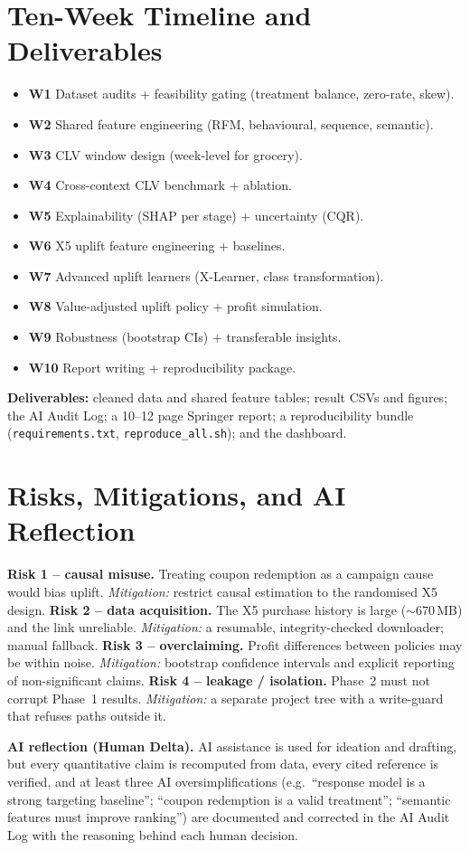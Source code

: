 \documentclass[pdflatex,sn-mathphys-num]{sn-jnl}
\begin{document}
\section{Ten-Week Timeline and Deliverables}\label{sec:time}
\begin{itemize}
\item \textbf{W1} Dataset audits + feasibility gating (treatment balance, zero-rate, skew).
\item \textbf{W2} Shared feature engineering (RFM, behavioural, sequence, semantic).
\item \textbf{W3} CLV window design (week-level for grocery).
\item \textbf{W4} Cross-context CLV benchmark + ablation.
\item \textbf{W5} Explainability (SHAP per stage) + uncertainty (CQR).
\item \textbf{W6} X5 uplift feature engineering + baselines.
\item \textbf{W7} Advanced uplift learners (X-Learner, class transformation).
\item \textbf{W8} Value-adjusted uplift policy + profit simulation.
\item \textbf{W9} Robustness (bootstrap CIs) + transferable insights.
\item \textbf{W10} Report writing + reproducibility package.
\end{itemize}
\noindent\textbf{Deliverables:} cleaned data and shared feature tables; result CSVs and figures;
the AI Audit Log; a 10--12 page Springer report; a reproducibility bundle (\texttt{requirements.txt},
\texttt{reproduce\_all.sh}); and the dashboard.

\section{Risks, Mitigations, and AI Reflection}\label{sec:risk}
\textbf{Risk 1 -- causal misuse.} Treating coupon redemption as a campaign cause would bias uplift.
\emph{Mitigation:} restrict causal estimation to the randomised X5 design.
\textbf{Risk 2 -- data acquisition.} The X5 purchase history is large ($\sim 670$\,MB) and the link
unreliable. \emph{Mitigation:} a resumable, integrity-checked downloader; manual fallback.
\textbf{Risk 3 -- overclaiming.} Profit differences between policies may be within noise.
\emph{Mitigation:} bootstrap confidence intervals and explicit reporting of non-significant claims.
\textbf{Risk 4 -- leakage / isolation.} Phase~2 must not corrupt Phase~1 results.
\emph{Mitigation:} a separate project tree with a write-guard that refuses paths outside it.

\noindent\textbf{AI reflection (Human Delta).} AI assistance is used for ideation and drafting, but
every quantitative claim is recomputed from data, every cited reference is verified, and at least
three AI oversimplifications (e.g.\ ``response model is a strong targeting baseline'';
``coupon redemption is a valid treatment''; ``semantic features must improve ranking'') are
documented and corrected in the AI Audit Log with the reasoning behind each human decision.
\end{document}
